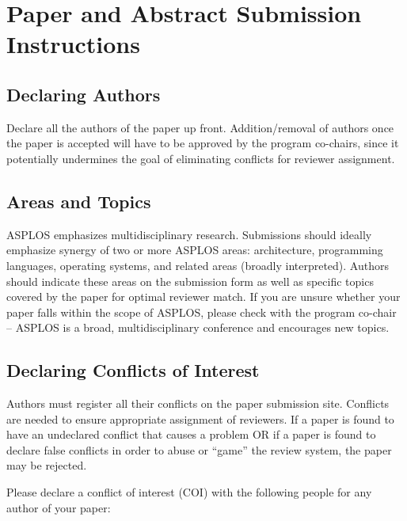 \documentclass[pageno]{jpaper}
\begin{document}
\section{Paper and Abstract Submission Instructions}

\subsection{Declaring Authors}

Declare all the authors of the paper up front. Addition/removal of authors
once the paper is accepted will have to be approved by the program co-chairs,
since it potentially undermines the goal of eliminating conflicts for
reviewer assignment.

\subsection{Areas and Topics}

ASPLOS emphasizes multidisciplinary research. Submissions should ideally
emphasize synergy of two or more ASPLOS areas: architecture, programming
languages, operating systems, and related areas (broadly
interpreted). Authors should indicate these areas on the submission form as
well as specific topics covered by the paper for optimal reviewer match. If
you are unsure whether your paper falls within the scope of ASPLOS, please
check with the program co-chair -- ASPLOS is a broad, multidisciplinary
conference and encourages new topics.

\subsection{Declaring Conflicts of Interest}

Authors must register all their conflicts on the paper submission site.
Conflicts are needed to ensure appropriate assignment of reviewers.
If a paper is found to have an undeclared conflict that causes
a problem OR if a paper is found to declare false conflicts in order to
abuse or ``game'' the review system, the paper may be rejected.

Please declare a conflict of interest (COI) with the following people
for any author of your paper:
\end{document}
